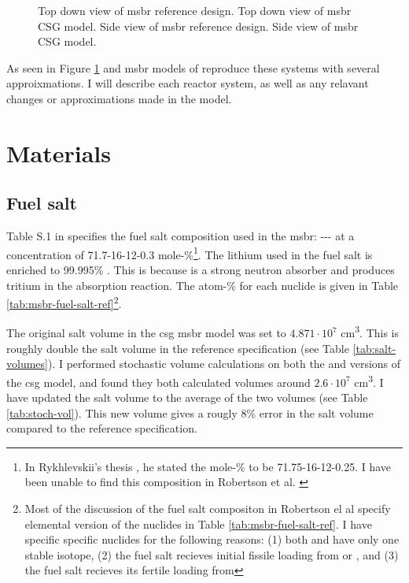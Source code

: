 \begin{figure}[htpb]
{        \label{fig:msbr-model-xz}
    }
    \caption[Full views of MSBR]{
         Top down view of \Gls{msbr} reference design.
         Top down view of \Gls{msbr} CSG model.
         Side view of \Gls{msbr} reference design.
         Side view of \Gls{msbr} CSG model.
    }
    \label{fig:msbr-overview}
\end{figure}

As seen in Figure \ref{fig:msbr-overview} \OpenMC and \SerpentTWO \Gls{msbr}
models of reproduce these systems with several approixmations. I will
describe each reactor system, as well as any relavant changes or
approximations made in the model.

\section{Materials}
\label{sec:msbr-materials}

\subsection{Fuel salt}
\label{sub:msbr-fuel-salt}
Table S.1 in \cite{robertson_conceptual_1971} specifies the fuel salt
composition used in the \Gls{msbr}:
--- at a
concentration of 71.7-16-12-0.3 mole-\%\footnote{In Rykhlevskii's thesis
\cite{rykhlevskii_fuel_2020}, he stated the mole-\% to be 71.75-16-12-0.25. I
have been unable to find this composition in Robertson et al.
\cite{robertson_conceptual_1971}}. The lithium used in the fuel salt is
enriched to 99.995\% . This is because  is a strong
neutron absorber and produces tritium in the absorption reaction. The atom-\%
for each nuclide is given in Table \ref{tab:msbr-fuel-salt-ref}\footnote{Most of the
discussion of the fuel salt compositon in Robertson el al
\cite{robertson_conceptual_1971} specify elemental version of the nuclides in
Table \ref{tab:msbr-fuel-salt-ref}. I have specific specific nuclides for the
following reasons: (1) both  and  have only one stable isotope, (2)
the fuel salt recieves initial fissile loading from  or
, and (3) the fuel salt recieves its fertile loading from
}.

The original salt volume in the \Gls{csg} \Gls{msbr} model was set to
$4.871\cdot 10^7$ \unit{\centi\metre\cubed}. This is roughly double the salt
volume in the reference specification (see Table \ref{tab:salt-volumes}). I
performed stochastic volume calculations on both the \SerpentTWO and \OpenMC
versions of the \Gls{csg} model, and found they both calculated volumes around
$2.6\cdot 10^7$ \unit{\centi\metre\cubed}. I have updated the salt volume to the
average of the two volumes (see Table \ref{tab:stoch-vol}). This new volume
gives a rougly 8\% error in the salt volume compared to the reference
specification.

